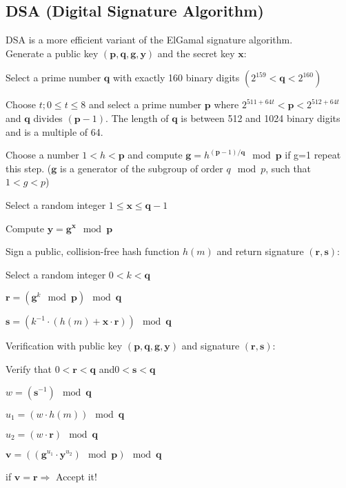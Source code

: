 \subsection{DSA (Digital Signature Algorithm)}
DSA is a more efficient variant of the ElGamal signature algorithm.\\
Generate a public key $(\bm {p,q,g,y})$ and the secret key $\bm x$:
\begin{aufzaehlung}
\item Select a prime number $\bm q$ with exactly 160 binary digits $(2^{159}< \bm q < 2^{160})$
\item Choose $t; 0 \leq t \leq 8$ and select a prime number $\bm p$ where $2^{511+64t}< \bm p < 2^{512+64t}$ and $\bm q$ divides $(\bm p-1)$. The length of $\bm q$ is between 512 and 1024 binary digits and is a multiple of 64.
\item Choose a number $1< h<\bm p$ and compute $\bm g = h^{(\bm p-1) / \bm q} \mod \bm p$ if g=1 repeat this step.
($\bm g$ is a generator of the subgroup of order $q \mod p$, such that $1<g<p$)
\item Select a random integer $1 \leq \bm x \leq \bm q-1$
\item Compute $\bm y=\bm g^{\bm x} \mod \bm p$
\end{aufzaehlung}
Sign a public, collision-free hash function $h(m)$ and return signature $(\bm {r,s})$:
\begin{aufzaehlung}
\item Select a random integer $0< k<\bm q$
\item $\bm r = (\bm g^k \mod \bm p) \mod \bm q$
\item $\bm s=(k^{-1} \cdot (h(m) + \bm x\cdot \bm r))\mod \bm q$
\end{aufzaehlung}
Verification with public key $(\bm {p,q,g,y})$ and signature $(\bm {r,s})$:
\begin{aufzaehlung}
\item Verify that $0<\bm r<\bm q$ and$0<\bm s<\bm q$
\item $w=(\bm s^{-1})\mod\bm q$
\item $u_1=( w\cdot h(m)) \mod \bm q$
\item $u_2=( w \cdot \bm r) \mod\bm q$
\item $\bm v=((\bm g^{u_1} \cdot \bm y^{u_2})\mod \bm  p) \mod \bm q$
\item if $\bm v= \bm r \Rightarrow$ Accept it!
\end{aufzaehlung}



